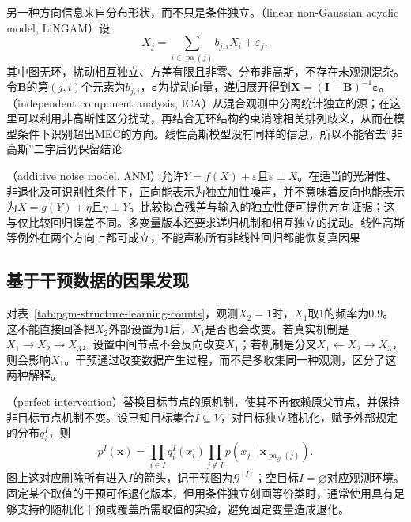另一种方向信息来自分布形状，而不只是条件独立。（linear non-Gaussian acyclic model, LiNGAM）设
\[
  X_j=\sum_{i\in\operatorname{pa}(j)}b_{j,i}X_i+\varepsilon_j,
\]
其中图无环，扰动相互独立、方差有限且非零、分布非高斯，不存在未观测混杂。令$\bm{B}$的第$(j,i)$个元素为$b_{j,i}$，$\bm{\varepsilon}$为扰动向量，递归展开得到$\bm{X}=(\bm{I}-\bm{B})^{-1}\bm{\varepsilon}$。（independent component analysis, ICA）从混合观测中分离统计独立的源；在这里可以利用非高斯性区分扰动，再结合无环结构约束消除相关排列歧义，从而在模型条件下识别超出MEC的方向。线性高斯模型没有同样的信息，所以不能省去“非高斯”二字后仍保留结论

（additive noise model, ANM）允许$Y=f(X)+\varepsilon$且$\varepsilon\perp X$。在适当的光滑性、非退化及可识别性条件下，正向能表示为独立加性噪声，并不意味着反向也能表示为$X=g(Y)+\eta$且$\eta\perp Y$。比较拟合残差与输入的独立性便可提供方向证据；这与仅比较回归误差不同。多变量版本还要求递归机制和相互独立的扰动。线性高斯等例外在两个方向上都可成立，不能声称所有非线性回归都能恢复真因果

\subsection{基于干预数据的因果发现}
\label{sec:pgm-structure-learning-interventional}

对表~\ref{tab:pgm-structure-learning-counts}，观测$X_2=1$时，$X_1$取$1$的频率为$0.9$。这不能直接回答把$X_2$外部设置为$1$后，$X_1$是否也会改变。若真实机制是$X_1\to X_2\to X_3$，设置中间节点不会反向改变$X_1$；若机制是分叉$X_1\leftarrow X_2\to X_3$，则会影响$X_1$。干预通过改变数据产生过程，而不是多收集同一种观测，区分了这两种解释。

（perfect intervention）替换目标节点的原机制，使其不再依赖原父节点，并保持非目标节点机制不变。设已知目标集合$I\subseteq V$，对目标独立随机化，赋予外部规定的分布$q_i^I$，则
\begin{equation}
  p^I(\bm{x})
  =\prod_{i\in I}q_i^I(x_i)
   \prod_{j\notin I}
      p(x_j\mid\bm{x}_{\operatorname{pa}_{\mathcal{G}}(j)}).
  \label{eq:pgm-structure-learning-intervention}
\end{equation}
图上这对应删除所有进入$I$的箭头，记干预图为$\mathcal{G}^{[I]}$；空目标$I=\varnothing$对应观测环境。固定某个取值的干预可作退化版本，但用条件独立刻画等价类时，通常使用具有足够支持的随机化干预或覆盖所需取值的实验，避免固定变量造成退化。

